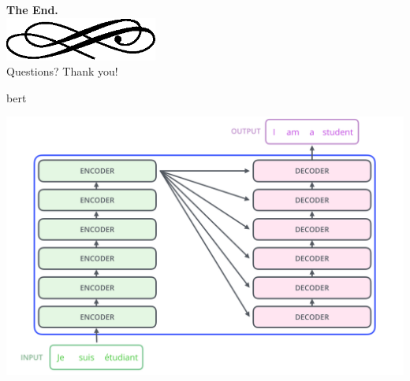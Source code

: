 \begin{frame}
  \begin{center}
    \textbf{\calligra\Huge The End.}\\
    \includegraphics[width=5cm]{img/ornament.eps}\\[1cm]
    {\huge\calligra Questions? Thank you!}
  \end{center}
\end{frame}


\backupbegin

\begin{frame}{\acf{bert}}
  \begin{center}
      \includegraphics[width=.5\textwidth]{img/transformer1.png}
      

\end{center}
\end{frame}
